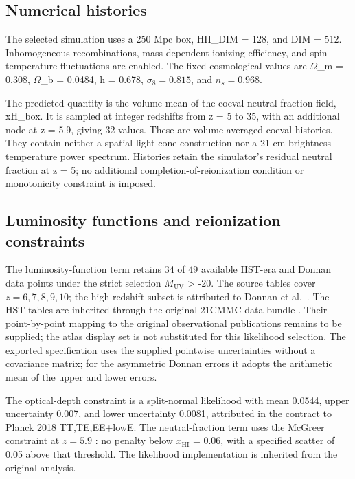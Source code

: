 \subsection{Numerical histories}\label{numerical-histories}

The selected simulation uses a 250 Mpc box, HII\_DIM = 128, and DIM = 512. Inhomogeneous recombinations, mass-dependent ionizing efficiency, and spin-temperature fluctuations are enabled. The fixed cosmological values are \(\Omega\)\_m = 0.308, \(\Omega\)\_b = 0.0484, h = 0.678, $\sigma_8=0.815$, and $n_s=0.968$.

The predicted quantity is the volume mean of the coeval neutral-fraction field, xH\_box. It is sampled at integer redshifts from z = 5 to 35, with an additional node at z = 5.9, giving 32 values. These are volume-averaged coeval histories. They contain neither a spatial light-cone construction nor a 21-cm brightness-temperature power spectrum. Histories retain the simulator's residual neutral fraction at z = 5; no additional completion-of-reionization condition or monotonicity constraint is imposed.

\subsection{Luminosity functions and reionization constraints}\label{luminosity-functions-and-reionization-constraints}\label{observational-data-and-inference}

The luminosity-function term retains 34 of 49 available HST-era and Donnan data points under the strict selection \ensuremath{M_{\mathrm{UV}}} \textgreater{} -20. The source tables cover $z=6,7,8,9,10$; the high-redshift subset is attributed to Donnan et al.~\cite{Donnan2024}. The HST tables are inherited through the original 21CMMC data bundle \cite{Greig2015,Park2019}. Their point-by-point mapping to the original observational publications remains to be supplied; the atlas display set is not substituted for this likelihood selection. The exported specification uses the supplied pointwise uncertainties without a covariance matrix; for the asymmetric Donnan errors it adopts the arithmetic mean of the upper and lower errors.

The optical-depth constraint \cite{Planck2018} is a split-normal likelihood with mean 0.0544, upper uncertainty 0.007, and lower uncertainty 0.0081, attributed in the contract to Planck 2018 TT,TE,EE+lowE. The neutral-fraction term uses the McGreer constraint at $z=5.9$ \cite{McGreer2015}: no penalty below \ensuremath{x_{\mathrm{HI}}} = 0.06, with a specified scatter of 0.05 above that threshold. The likelihood implementation is inherited from the original analysis.

